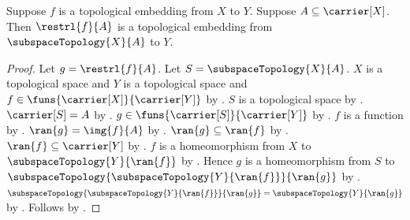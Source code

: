 \begin{theorem}\label{topological_embedding_restriction}
    Suppose $f$ is a topological embedding from $X$ to $Y$.
    Suppose $A\subseteq\carrier[X]$.
    Then $\restrl{f}{A}$ is a topological embedding from
        $\subspaceTopology{X}{A}$ to $Y$.
\end{theorem}
\begin{proof}
    Let $g=\restrl{f}{A}$.
    Let $S=\subspaceTopology{X}{A}$.
    $X$ is a topological space and $Y$ is a topological space and
        $f\in\funs{\carrier[X]}{\carrier[Y]}$ by
        .
    $S$ is a topological space by
        .
    $\carrier[S]=A$ by .
    $g\in\funs{\carrier[S]}{\carrier[Y]}$ by .
    $f$ is a function by .
    $\ran{g}=\img{f}{A}$ by .
    $\ran{g}\subseteq\ran{f}$ by .
    $\ran{f}\subseteq\carrier[Y]$ by .
    $f$ is a homeomorphism from $X$ to $\subspaceTopology{Y}{\ran{f}}$
        by .
    Hence $g$ is a homeomorphism from $S$ to
        $\subspaceTopology{\subspaceTopology{Y}{\ran{f}}}{\ran{g}}$
        by .
    $\subspaceTopology{\subspaceTopology{Y}{\ran{f}}}{\ran{g}}
        =\subspaceTopology{Y}{\ran{g}}$ by
        .
    Follows by .
\end{proof}

